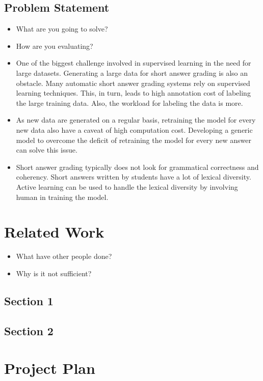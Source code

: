 \documentclass[rnd]{mas_proposal}
\begin{document}
\section{Problem Statement}
\begin{itemize}
    \item What are you going to solve?
    \item How are you evaluating?
    
\vspace*{1\baselineskip}
    \item One of the biggest challenge involved in supervised learning in the need for large datasets. Generating a large data for short answer grading is also an obstacle. Many automatic short answer grading systems rely on supervised learning techniques. This, in turn, leads to high annotation cost of labeling the large training data. Also, the workload for labeling the data is more.
    \item As new data are generated on a regular basis, retraining the model for every new data also have a caveat of high computation cost.  Developing a generic model to overcome the deficit of retraining the model for every new answer can solve this issue.
    \item Short answer grading typically does not look for grammatical correctness and coherency. Short answers written by students have a lot of lexical diversity. Active learning can be used to handle the lexical diversity by involving human in training the model.
\end{itemize}


\chapter{Related Work}
\begin{itemize}
    \item What have other people done?
    \item Why is it not sufficient?
\end{itemize}

\section{Section 1}
\section{Section 2}



\chapter{Project Plan}
\end{document}
